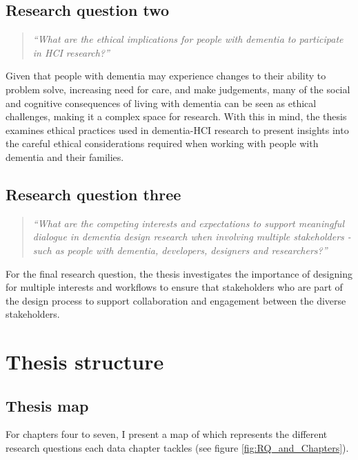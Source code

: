 \subsection{Research question two}
\label{RQ2}
\begin{quote}
\textit{``What are the ethical implications for people with dementia to participate in HCI research?''}
\end{quote}
Given that people with dementia may experience changes to their ability to problem solve, increasing need for care, and make judgements, many of the social and cognitive consequences of living with dementia can be seen as ethical challenges, making it a complex space for research. With this in mind, the thesis examines ethical practices used in dementia-HCI research to present insights into the careful ethical considerations required when working with people with dementia and their families. 

\subsection{Research question three}
\label{RQ3}
\begin{quote}
\textit{``What are the competing interests and expectations to support meaningful dialogue in dementia design research when involving multiple stakeholders - such as people with dementia, developers, designers and researchers?''}
\end{quote}
For the final research question, the thesis investigates the importance of designing for multiple interests and workflows to ensure that stakeholders who are part of the design process to support collaboration and engagement between the diverse stakeholders. 

\section{Thesis structure}
\label{Intro: Thesis structure}

\subsection{Thesis map}
For chapters four to seven, I present a map of which represents the different research questions each data chapter tackles (see figure \ref{fig:RQ_and_Chapters}).

